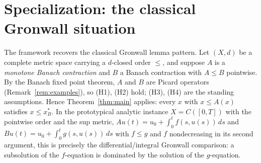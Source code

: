 \documentclass{amsart}
\theoremstyle{plain}
\theoremstyle{definition}
\newcommand{\xB}{x^{*}_{B}}
\begin{document}
\section{Specialization: the classical Gronwall situation}

The framework recovers the classical Gronwall lemma pattern. Let $(X,d)$ be a
complete metric space carrying a $d$-closed order $\le$, and suppose $A$ is a
\emph{monotone Banach contraction} and $B$ a Banach contraction with $A\le B$
pointwise. By the Banach fixed point theorem, $A$ and $B$ are Picard operators
(Remark~\ref{rem:examples}), so (H1), (H2) hold; (H3), (H4) are the standing
assumptions. Hence Theorem~\ref{thm:main} applies: every $x$ with $x\le A(x)$
satisfies $x\le\xB$. In the prototypical analytic instance $X=C([0,T])$ with the
pointwise order and the sup metric, $A u(t)=u_0+\int_0^t f(s,u(s))\,ds$ and
$B u(t)=u_0+\int_0^t g(s,u(s))\,ds$ with $f\le g$ and $f$ nondecreasing in its
second argument, this is precisely the differential/integral Gronwall
comparison: a subsolution of the $f$-equation is dominated by the solution of
the $g$-equation.
\end{document}
